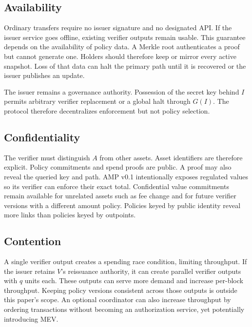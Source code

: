 \documentclass[11pt]{article}
\begin{document}
    \subsection{Availability}

    Ordinary transfers require no issuer signature and no designated API.
    If the issuer service goes offline, existing verifier outputs remain usable.
    This guarantee depends on the availability of policy data.
    A Merkle root authenticates a proof but cannot generate one.
    Holders should therefore keep or mirror every active snapshot.
    Loss of that data can halt the primary path until it is recovered or the issuer publishes an update.

    The issuer remains a governance authority.
    Possession of the secret key behind $I$ permits arbitrary verifier replacement or a global halt through $G(I)$.
    The protocol therefore decentralizes enforcement but not policy selection.

    \subsection{Confidentiality}

    The verifier must distinguish $A$ from other assets.
    Asset identifiers are therefore explicit.
    Policy commitments and spend proofs are public.
    A proof may also reveal the queried key and path.
    AMP v0.1 intentionally exposes regulated values so its verifier can enforce their exact total. Confidential value commitments remain available for unrelated assets such as fee change and for future verifier versions with a different amount policy.
    Policies keyed by public identity reveal more links than policies keyed by outpoints.

    \subsection{Contention}

    A single verifier output creates a spending race condition, limiting throughput.
    If the issuer retains $V$'s reissuance authority, it can create parallel verifier outputs with $q$ units each.
    These outputs can serve more demand and increase per-block throughput.
    Keeping policy versions consistent across those outputs is outside this paper's scope.
    An optional coordinator can also increase throughput by ordering transactions without becoming an authorization service, yet potentially introducing MEV.
\end{document}
